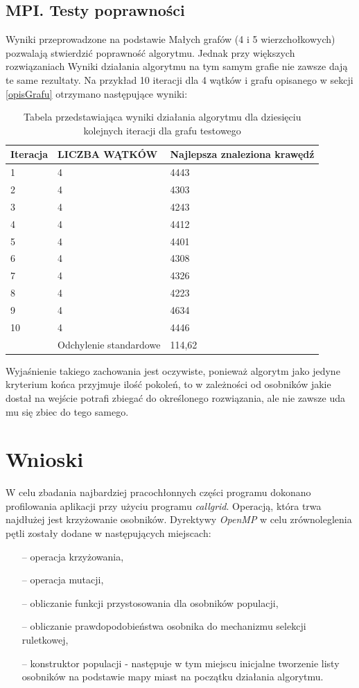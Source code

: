 \documentclass[10pt,a4paper]{article}
\begin{document}
\subsection{MPI. Testy poprawności}
Wyniki przeprowadzone na podstawie Małych grafów (4 i 5 wierzchołkowych) pozwalają stwierdzić poprawność algorytmu. 
Jednak przy większych rozwiązaniach Wyniki działania algorytmu na tym samym grafie nie zawsze dają te same rezultaty.  
Na przykład 10 iteracji dla 4 wątków i grafu opisanego w sekcji \ref{opisGrafu} otrzymano następujące wyniki:
 
 \begin{table}[H]
 \begin{tabular}{|p{2cm}|p{2cm}|p{4cm}|}
 \hline
 Iteracja & LICZBA  WĄTKÓW & Najlepsza znaleziona krawędź\\\hline
1 & 4 & 4443\\\hline
2 & 4 & 4303\\\hline
3 & 4 & 4243\\\hline
4 & 4 & 4412\\\hline
5 & 4 & 4401\\\hline
6 & 4 & 4308\\\hline
7 & 4 & 4326\\\hline
8 & 4 & 4223\\\hline
9 & 4 & 4634\\\hline
10 & 4 & 4446\\\hline
& Odchylenie standardowe & 114,62\\\hline
 
 \end{tabular}
 \caption{Tabela przedstawiająca wyniki działania algorytmu dla dziesięciu kolejnych iteracji dla grafu testowego}
 \end{table}
 
 Wyjaśnienie takiego zachowania jest oczywiste, ponieważ algorytm jako jedyne kryterium końca przyjmuje ilość pokoleń, to w zależności od osobników jakie dostał na wejście potrafi zbiegać do określonego rozwiązania, ale nie zawsze uda mu się zbiec do tego samego.
 
\section{Wnioski}
W celu zbadania najbardziej pracochłonnych części programu dokonano profilowania aplikacji przy użyciu programu \textit{callgrid}. Operacją, która trwa najdłużej jest krzyżowanie osobników. Dyrektywy \textit{OpenMP} w celu zrównoleglenia pętli zostały dodane w następujących miejscach:
\begin{itemize}
\item[--] operacja krzyżowania,
\item[--] operacja mutacji,
\item[--] obliczanie funkcji przystosowania dla osobników populacji,
\item[--] obliczanie prawdopodobieństwa osobnika do mechanizmu selekcji ruletkowej,
\item[--] konstruktor populacji - następuje w tym miejscu inicjalne tworzenie listy osobników na podstawie mapy miast na początku działania algorytmu.
\end{itemize}
\end{document}
